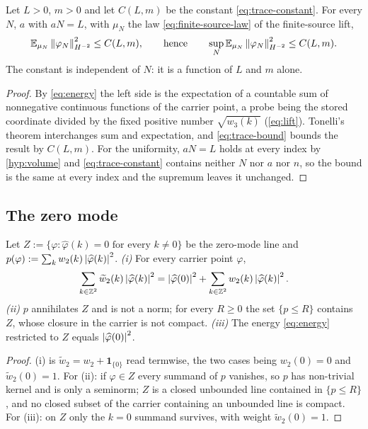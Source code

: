 \begin{theorem}\label{thm:uniform-moment}
Let $L>0$, $m>0$ and let $C(L,m)$ be the constant
\eqref{eq:trace-constant}. For every $N$, $a$ with $aN=L$, with $\mu_N$ the
law \eqref{eq:finite-source-law} of the finite-source lift,
\[
  \mathbb{E}_{\mu_N}\left\| \varphi_N \right\|^2_{H^{-2}}\le C(L,m),
  \qquad\text{hence}\qquad
  \sup_{N}\mathbb{E}_{\mu_N}\left\| \varphi_N \right\|^2_{H^{-2}}\le C(L,m).
\]
The constant is independent of $N$: it is a function of $L$ and $m$ alone.
\end{theorem}

\begin{proof}
By \eqref{eq:energy} the left side is the expectation of a countable sum of
nonnegative continuous functions of the carrier point, a probe being the
stored coordinate divided by the fixed positive number $\sqrt{w_3(k)}$
(\cref{eq:lift}). Tonelli's theorem interchanges sum and expectation, and
\eqref{eq:trace-bound} bounds the result by $C(L,m)$. For the uniformity,
$aN=L$ holds at every index by \cref{hyp:volume} and
\eqref{eq:trace-constant} contains neither $N$ nor $a$ nor $n$, so the
bound is the same at every index and the supremum leaves it unchanged.
\end{proof}

\subsection{The zero mode}

\begin{lemma}\label{lem:zero-mode}
Let $Z:=\{\varphi:\widehat\varphi(k)=0 \text{ for every } k\neq0\}$ be the
zero-mode line and $p(\varphi):=\sum_k w_2(k)\left| \widehat\varphi(k) \right|^2$.
\emph{(i)} For every carrier point $\varphi$,
\[
  \sum_{k\in\mathbb{Z}^2}\widetilde w_2(k)\left| \widehat\varphi(k) \right|^2
  =\left| \widehat\varphi(0) \right|^{2}
   +\sum_{k\in\mathbb{Z}^2}w_2(k)\left| \widehat\varphi(k) \right|^{2}.
\]
\emph{(ii)} $p$ annihilates $Z$ and is not a norm; for every $R\ge0$ the
set $\{p\le R\}$ contains $Z$, whose closure in the carrier is not compact.
\emph{(iii)} The energy \eqref{eq:energy} restricted to $Z$ equals
$\left| \widehat\varphi(0) \right|^{2}$.
\end{lemma}

\begin{proof}
(i) is $\widetilde w_2=w_2+\mathbf 1_{\{0\}}$ read termwise, the two cases
being $w_2(0)=0$ and $\widetilde w_2(0)=1$. For (ii): if $\varphi\in Z$
every summand of $p$ vanishes, so $p$ has non-trivial kernel and is only a
seminorm; $Z$ is a closed unbounded line contained in $\{p\le R\}$, and no
closed subset of the carrier containing an unbounded line is compact. For
(iii): on $Z$ only the $k=0$ summand survives, with weight
$\widetilde w_2(0)=1$.
\end{proof}

